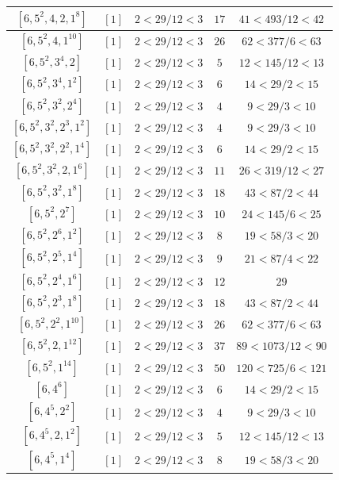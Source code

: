 \documentclass{article}%
\begin{document}
\begin{center}
\begin{longtable}{||c|c|c|c|c||}
$[6, 5^{2}, 4, 2, 1^{8}]$ & $[1]$ & $2 < 29/12 < 3$ & $17$ & $41 < 493/12 < 42$ \\ \hline 
$[6, 5^{2}, 4, 1^{10}]$ & $[1]$ & $2 < 29/12 < 3$ & $26$ & $62 < 377/6 < 63$ \\ \hline 
$[6, 5^{2}, 3^{4}, 2]$ & $[1]$ & $2 < 29/12 < 3$ & $5$ & $12 < 145/12 < 13$ \\ \hline 
$[6, 5^{2}, 3^{4}, 1^{2}]$ & $[1]$ & $2 < 29/12 < 3$ & $6$ & $14 < 29/2 < 15$ \\ \hline 
$[6, 5^{2}, 3^{2}, 2^{4}]$ & $[1]$ & $2 < 29/12 < 3$ & $4$ & $9 < 29/3 < 10$ \\ \hline 
$[6, 5^{2}, 3^{2}, 2^{3}, 1^{2}]$ & $[1]$ & $2 < 29/12 < 3$ & $4$ & $9 < 29/3 < 10$ \\ \hline 
$[6, 5^{2}, 3^{2}, 2^{2}, 1^{4}]$ & $[1]$ & $2 < 29/12 < 3$ & $6$ & $14 < 29/2 < 15$ \\ \hline 
$[6, 5^{2}, 3^{2}, 2, 1^{6}]$ & $[1]$ & $2 < 29/12 < 3$ & $11$ & $26 < 319/12 < 27$ \\ \hline 
$[6, 5^{2}, 3^{2}, 1^{8}]$ & $[1]$ & $2 < 29/12 < 3$ & $18$ & $43 < 87/2 < 44$ \\ \hline 
$[6, 5^{2}, 2^{7}]$ & $[1]$ & $2 < 29/12 < 3$ & $10$ & $24 < 145/6 < 25$ \\ \hline 
$[6, 5^{2}, 2^{6}, 1^{2}]$ & $[1]$ & $2 < 29/12 < 3$ & $8$ & $19 < 58/3 < 20$ \\ \hline 
$[6, 5^{2}, 2^{5}, 1^{4}]$ & $[1]$ & $2 < 29/12 < 3$ & $9$ & $21 < 87/4 < 22$ \\ \hline 
$[6, 5^{2}, 2^{4}, 1^{6}]$ & $[1]$ & $2 < 29/12 < 3$ & $12$ & $29$ \\ \hline 
$[6, 5^{2}, 2^{3}, 1^{8}]$ & $[1]$ & $2 < 29/12 < 3$ & $18$ & $43 < 87/2 < 44$ \\ \hline 
$[6, 5^{2}, 2^{2}, 1^{10}]$ & $[1]$ & $2 < 29/12 < 3$ & $26$ & $62 < 377/6 < 63$ \\ \hline 
$[6, 5^{2}, 2, 1^{12}]$ & $[1]$ & $2 < 29/12 < 3$ & $37$ & $89 < 1073/12 < 90$ \\ \hline 
$[6, 5^{2}, 1^{14}]$ & $[1]$ & $2 < 29/12 < 3$ & $50$ & $120 < 725/6 < 121$ \\ \hline 
$[6, 4^{6}]$ & $[1]$ & $2 < 29/12 < 3$ & $6$ & $14 < 29/2 < 15$ \\ \hline 
$[6, 4^{5}, 2^{2}]$ & $[1]$ & $2 < 29/12 < 3$ & $4$ & $9 < 29/3 < 10$ \\ \hline 
$[6, 4^{5}, 2, 1^{2}]$ & $[1]$ & $2 < 29/12 < 3$ & $5$ & $12 < 145/12 < 13$ \\ \hline 
$[6, 4^{5}, 1^{4}]$ & $[1]$ & $2 < 29/12 < 3$ & $8$ & $19 < 58/3 < 20$ \\ \hline 

\end{longtable}
\end{center}
\end{document}
